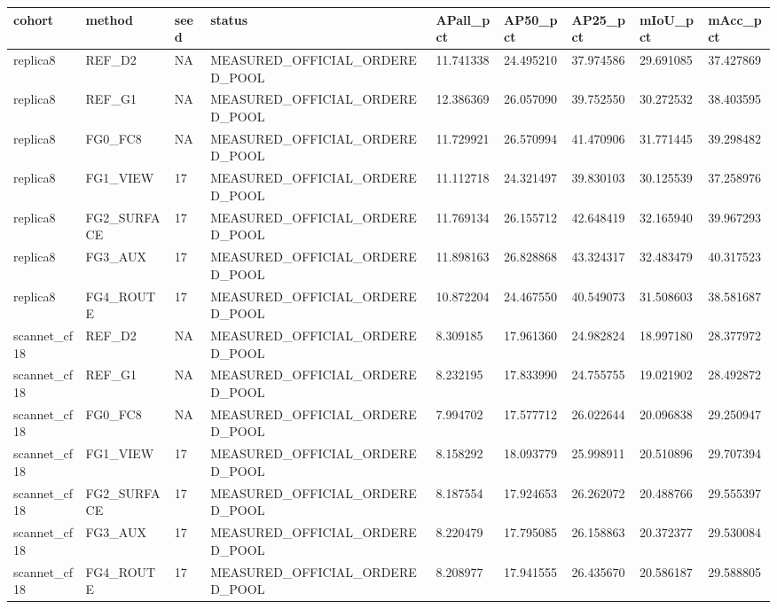 \begin{tabular}{lllllllll}
\toprule
cohort & method & seed & status & APall\_pct & AP50\_pct & AP25\_pct & mIoU\_pct & mAcc\_pct \\
\midrule
replica8 & REF\_D2 & NA & MEASURED\_OFFICIAL\_ORDERED\_POOL & 11.741338 & 24.495210 & 37.974586 & 29.691085 & 37.427869 \\
replica8 & REF\_G1 & NA & MEASURED\_OFFICIAL\_ORDERED\_POOL & 12.386369 & 26.057090 & 39.752550 & 30.272532 & 38.403595 \\
replica8 & FG0\_FC8 & NA & MEASURED\_OFFICIAL\_ORDERED\_POOL & 11.729921 & 26.570994 & 41.470906 & 31.771445 & 39.298482 \\
replica8 & FG1\_VIEW & 17 & MEASURED\_OFFICIAL\_ORDERED\_POOL & 11.112718 & 24.321497 & 39.830103 & 30.125539 & 37.258976 \\
replica8 & FG2\_SURFACE & 17 & MEASURED\_OFFICIAL\_ORDERED\_POOL & 11.769134 & 26.155712 & 42.648419 & 32.165940 & 39.967293 \\
replica8 & FG3\_AUX & 17 & MEASURED\_OFFICIAL\_ORDERED\_POOL & 11.898163 & 26.828868 & 43.324317 & 32.483479 & 40.317523 \\
replica8 & FG4\_ROUTE & 17 & MEASURED\_OFFICIAL\_ORDERED\_POOL & 10.872204 & 24.467550 & 40.549073 & 31.508603 & 38.581687 \\
scannet\_cf18 & REF\_D2 & NA & MEASURED\_OFFICIAL\_ORDERED\_POOL & 8.309185 & 17.961360 & 24.982824 & 18.997180 & 28.377972 \\
scannet\_cf18 & REF\_G1 & NA & MEASURED\_OFFICIAL\_ORDERED\_POOL & 8.232195 & 17.833990 & 24.755755 & 19.021902 & 28.492872 \\
scannet\_cf18 & FG0\_FC8 & NA & MEASURED\_OFFICIAL\_ORDERED\_POOL & 7.994702 & 17.577712 & 26.022644 & 20.096838 & 29.250947 \\
scannet\_cf18 & FG1\_VIEW & 17 & MEASURED\_OFFICIAL\_ORDERED\_POOL & 8.158292 & 18.093779 & 25.998911 & 20.510896 & 29.707394 \\
scannet\_cf18 & FG2\_SURFACE & 17 & MEASURED\_OFFICIAL\_ORDERED\_POOL & 8.187554 & 17.924653 & 26.262072 & 20.488766 & 29.555397 \\
scannet\_cf18 & FG3\_AUX & 17 & MEASURED\_OFFICIAL\_ORDERED\_POOL & 8.220479 & 17.795085 & 26.158863 & 20.372377 & 29.530084 \\
scannet\_cf18 & FG4\_ROUTE & 17 & MEASURED\_OFFICIAL\_ORDERED\_POOL & 8.208977 & 17.941555 & 26.435670 & 20.586187 & 29.588805 \\
\bottomrule
\end{tabular}
